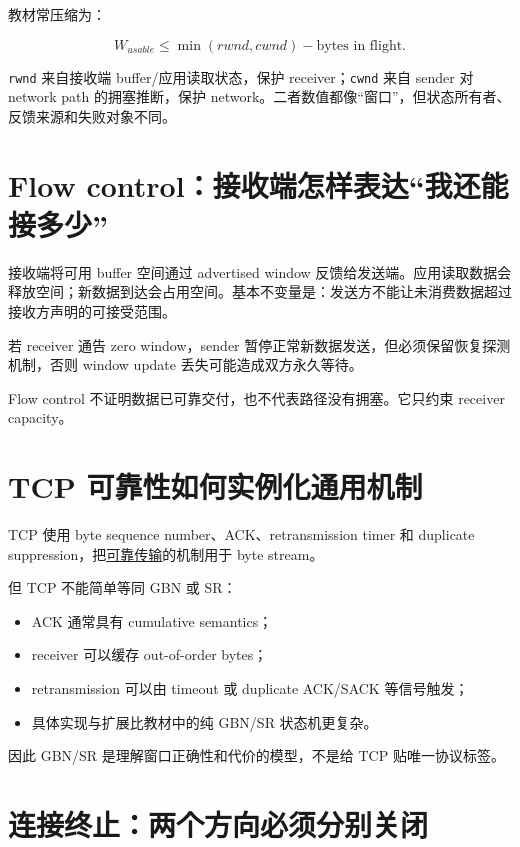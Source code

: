 \documentclass[UTF8,fontset=none,11pt,a4paper]{ctexart}
\providecommand{\tightlist}{\setlength{\itemsep}{0pt}\setlength{\parskip}{0pt}}
\providecommand{\passthrough}[1]{#1}
\begin{document}
教材常压缩为：

\[
W_{usable}\le \min(rwnd,cwnd)-\text{bytes in flight}.
\]

\passthrough{\lstinline!rwnd!} 来自接收端 buffer/应用读取状态，保护
receiver；\passthrough{\lstinline!cwnd!} 来自 sender 对 network path
的拥塞推断，保护
network。二者数值都像``窗口''，但状态所有者、反馈来源和失败对象不同。

\section{Flow
control：接收端怎样表达``我还能接多少''}\label{7-flow-controlux63a5ux6536ux7aefux600eux6837ux8868ux8fbeux6211ux8fd8ux80fdux63a5ux591aux5c11}

接收端将可用 buffer 空间通过 advertised window
反馈给发送端。应用读取数据会释放空间；新数据到达会占用空间。基本不变量是：发送方不能让未消费数据超过接收方声明的可接受范围。

若 receiver 通告 zero window，sender
暂停正常新数据发送，但必须保留恢复探测机制，否则 window update
丢失可能造成双方永久等待。

Flow control 不证明数据已可靠交付，也不代表路径没有拥塞。它只约束
receiver capacity。

\section{TCP
可靠性如何实例化通用机制}\label{8-tcp-ux53efux9760ux6027ux5982ux4f55ux5b9eux4f8bux5316ux901aux7528ux673aux5236}

TCP 使用 byte sequence number、ACK、retransmission timer 和 duplicate
suppression，把\href{../03_可靠传输_序号_ACK_定时器与滑动窗口/README.md}{可靠传输}的机制用于
byte stream。

但 TCP 不能简单等同 GBN 或 SR：

\begin{itemize}
\tightlist
\item
  ACK 通常具有 cumulative semantics；
\item
  receiver 可以缓存 out-of-order bytes；
\item
  retransmission 可以由 timeout 或 duplicate ACK/SACK 等信号触发；
\item
  具体实现与扩展比教材中的纯 GBN/SR 状态机更复杂。
\end{itemize}

因此 GBN/SR 是理解窗口正确性和代价的模型，不是给 TCP 贴唯一协议标签。

\section{连接终止：两个方向必须分别关闭}\label{9-ux8fdeux63a5ux7ec8ux6b62ux4e24ux4e2aux65b9ux5411ux5fc5ux987bux5206ux522bux5173ux95ed}
\end{document}
